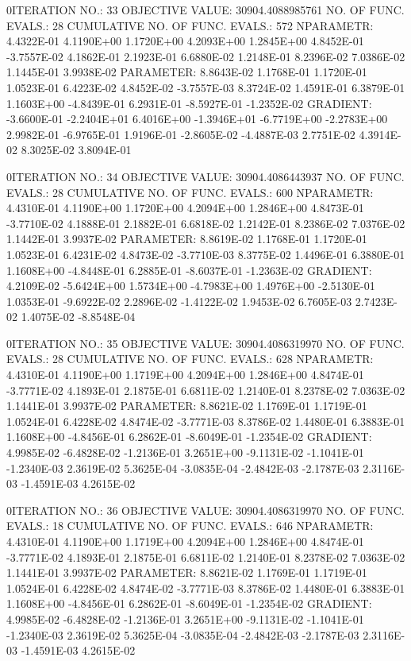 \documentclass[
  letterpaper,
  toc=chapterentrywithdots,
  listof=totoc,
  11pt,
  headings=small,
  usegeometry]{scrreprt}
\begin{document}
\begin{nonmemlisting}
0ITERATION NO.:   33    OBJECTIVE VALUE:   30904.4088985761        NO. OF FUNC. EVALS.:  28
 CUMULATIVE NO. OF FUNC. EVALS.:      572
 NPARAMETR:  4.4322E-01  4.1190E+00  1.1720E+00  4.2093E+00  1.2845E+00  4.8452E-01 -3.7557E-02  4.1862E-01  2.1923E-01  6.6880E-02
             1.2148E-01  8.2396E-02  7.0386E-02  1.1445E-01  3.9938E-02
 PARAMETER:  8.8643E-02  1.1768E-01  1.1720E-01  1.0523E-01  6.4223E-02  4.8452E-02 -3.7557E-03  8.3724E-02  1.4591E-01  6.3879E-01
             1.1603E+00 -4.8439E-01  6.2931E-01 -8.5927E-01 -1.2352E-02
 GRADIENT:  -3.6600E-01 -2.2404E+01  6.4016E+00 -1.3946E+01 -6.7719E+00 -2.2783E+00  2.9982E-01 -6.9765E-01  1.9196E-01 -2.8605E-02
            -4.4887E-03  2.7751E-02  4.3914E-02  8.3025E-02  3.8094E-01

0ITERATION NO.:   34    OBJECTIVE VALUE:   30904.4086443937        NO. OF FUNC. EVALS.:  28
 CUMULATIVE NO. OF FUNC. EVALS.:      600
 NPARAMETR:  4.4310E-01  4.1190E+00  1.1720E+00  4.2094E+00  1.2846E+00  4.8473E-01 -3.7710E-02  4.1888E-01  2.1882E-01  6.6818E-02
             1.2142E-01  8.2386E-02  7.0376E-02  1.1442E-01  3.9937E-02
 PARAMETER:  8.8619E-02  1.1768E-01  1.1720E-01  1.0523E-01  6.4231E-02  4.8473E-02 -3.7710E-03  8.3775E-02  1.4496E-01  6.3880E-01
             1.1608E+00 -4.8448E-01  6.2885E-01 -8.6037E-01 -1.2363E-02
 GRADIENT:   4.2109E-02 -5.6424E+00  1.5734E+00 -4.7983E+00  1.4976E+00 -2.5130E-01  1.0353E-01 -9.6922E-02  2.2896E-02 -1.4122E-02
             1.9453E-02  6.7605E-03  2.7423E-02  1.4075E-02 -8.8548E-04

0ITERATION NO.:   35    OBJECTIVE VALUE:   30904.4086319970        NO. OF FUNC. EVALS.:  28
 CUMULATIVE NO. OF FUNC. EVALS.:      628
 NPARAMETR:  4.4310E-01  4.1190E+00  1.1719E+00  4.2094E+00  1.2846E+00  4.8474E-01 -3.7771E-02  4.1893E-01  2.1875E-01  6.6811E-02
             1.2140E-01  8.2378E-02  7.0363E-02  1.1441E-01  3.9937E-02
 PARAMETER:  8.8621E-02  1.1769E-01  1.1719E-01  1.0524E-01  6.4228E-02  4.8474E-02 -3.7771E-03  8.3786E-02  1.4480E-01  6.3883E-01
             1.1608E+00 -4.8456E-01  6.2862E-01 -8.6049E-01 -1.2354E-02
 GRADIENT:   4.9985E-02 -6.4828E-02 -1.2136E-01  3.2651E+00 -9.1131E-02 -1.1041E-01 -1.2340E-03  2.3619E-02  5.3625E-04 -3.0835E-04
            -2.4842E-03 -2.1787E-03  2.3116E-03 -1.4591E-03  4.2615E-02

0ITERATION NO.:   36    OBJECTIVE VALUE:   30904.4086319970        NO. OF FUNC. EVALS.:  18
 CUMULATIVE NO. OF FUNC. EVALS.:      646
 NPARAMETR:  4.4310E-01  4.1190E+00  1.1719E+00  4.2094E+00  1.2846E+00  4.8474E-01 -3.7771E-02  4.1893E-01  2.1875E-01  6.6811E-02
             1.2140E-01  8.2378E-02  7.0363E-02  1.1441E-01  3.9937E-02
 PARAMETER:  8.8621E-02  1.1769E-01  1.1719E-01  1.0524E-01  6.4228E-02  4.8474E-02 -3.7771E-03  8.3786E-02  1.4480E-01  6.3883E-01
             1.1608E+00 -4.8456E-01  6.2862E-01 -8.6049E-01 -1.2354E-02
 GRADIENT:   4.9985E-02 -6.4828E-02 -1.2136E-01  3.2651E+00 -9.1131E-02 -1.1041E-01 -1.2340E-03  2.3619E-02  5.3625E-04 -3.0835E-04
            -2.4842E-03 -2.1787E-03  2.3116E-03 -1.4591E-03  4.2615E-02


\end{nonmemlisting}
\end{document}
